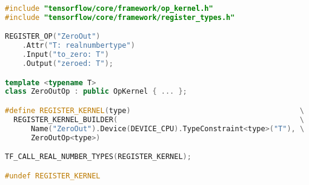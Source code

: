 \begin{lstlisting}[language=C++]
#include "tensorflow/core/framework/op_kernel.h"
#include "tensorflow/core/framework/register_types.h"

REGISTER_OP("ZeroOut")
    .Attr("T: realnumbertype")
    .Input("to_zero: T")
    .Output("zeroed: T");

template <typename T>
class ZeroOutOp : public OpKernel { ... };

#define REGISTER_KERNEL(type)                                       \
  REGISTER_KERNEL_BUILDER(                                          \
      Name("ZeroOut").Device(DEVICE_CPU).TypeConstraint<type>("T"), \
      ZeroOutOp<type>)

TF_CALL_REAL_NUMBER_TYPES(REGISTER_KERNEL);

#undef REGISTER_KERNEL
\end{lstlisting}
